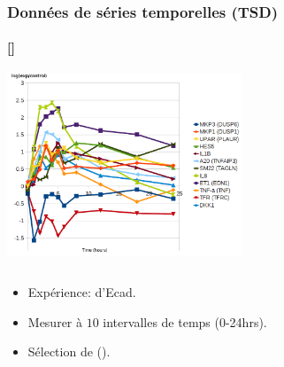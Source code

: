 \begin{frame}[c]
  \frametitle{Données de séries temporelles (TSD)}
  \framesubtitle{{\small \color{darkgreen} [\citedata]}}
  
\begin{center}
  \includegraphics[width=70mm]{figs/12genes.png}
\end{center}


\begin{columns}
\begin{column}{0.7\textwidth}
\begin{itemize}
  \item Expérience:  d'Ecad.
  \item Mesurer à  $10$ intervalles de temps (0-24hrs).
  \item Sélection de   (). %
\end{itemize}
\end{column}

\begin{column}{0.3\textwidth}

\end{column}
\end{columns}

\end{frame}

